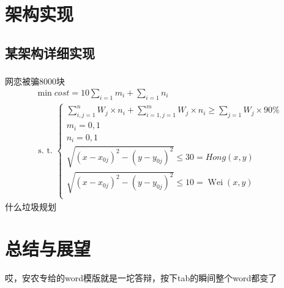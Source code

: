 \documentclass[UTF8,a4paper,12pt]{ctexart}
\begin{document}
	\section{架构实现}
	\subsection{某架构详细实现}
	网恋被骗8000块\textsuperscript{\cite{Ref3}}
	\begin{equation}
		\begin{array}{c}
			\min cost  =10 \sum_{i=1} m_{i}+\sum_{i=1} n_{i}  \\
			\text { s. t. }\left\{\begin{array}{l}
				\sum_{i, j=1}^{n} W_{j} \times n_{i}+\sum_{i=1, j=1}^{m} W_{j} \times n_{i} \geq  \sum_{j=1}^{} W_{j} \times 90\% \\
				m_{i}=0,1  \\ 
				n_{i}=0,1  \\
				\sqrt{\left(x-x_{0j}\right)^{2}-\left(y-y_{0j}\right)^{2}} \leq 30=H o n g(x, y) \\
				\sqrt{\left(x-x_{0j}\right)^{2}-\left(y-y_{0j}\right)^{2}} \leq 10=\operatorname{Wei}(x, y)\\
			\end{array}\right.
		\end{array}
	\end{equation}
	什么垃圾规划

	\section{总结与展望}
	哎，安农专给的word模版就是一坨答辩，按下tab的瞬间整个word都变了
	
\end{document}
